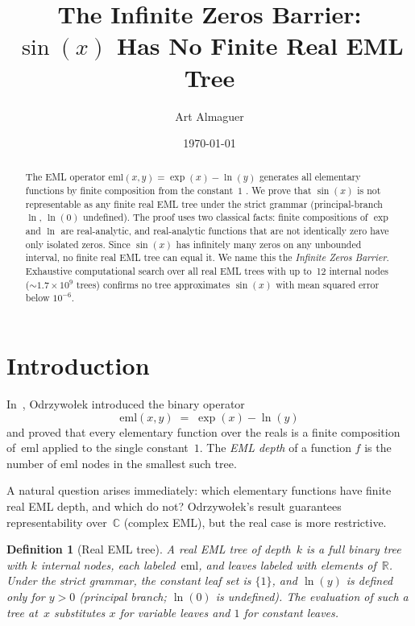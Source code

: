 \documentclass[11pt,a4paper]{amsart}
\title{The Infinite Zeros Barrier:\\
  \large $\sin(x)$ Has No Finite Real EML Tree}
\author{Art Almaguer}
\date{\today}
\newtheorem{definition}[theorem]{Definition}
\newcommand{\eml}{\mathrm{eml}}
\newcommand{\R}{\mathbb{R}}
\newcommand{\C}{\mathbb{C}}
\begin{document}
\begin{abstract}
The EML operator $\eml(x,y) = \exp(x) - \ln(y)$ generates all elementary
functions by finite composition from the constant~$1$
\cite{odzryzwolek2026eml}.
We prove that $\sin(x)$ is not representable as any finite real EML tree
under the strict grammar (principal-branch $\ln$, $\ln(0)$ undefined).
The proof uses two classical facts: finite compositions of $\exp$ and $\ln$
are real-analytic, and real-analytic functions that are not identically zero
have only isolated zeros.  Since $\sin(x)$ has infinitely many zeros on any
unbounded interval, no finite real EML tree can equal it.
We name this the \emph{Infinite Zeros Barrier}.
Exhaustive computational search over all real EML trees with up to~12
internal nodes ($\sim\!1.7 \times 10^9$ trees) confirms no tree approximates
$\sin(x)$ with mean squared error below $10^{-6}$.
\end{abstract}

\maketitle

\section{Introduction}

In~\cite{odzryzwolek2026eml}, Odrzywołek introduced the binary operator
\[
  \eml(x,y) \;=\; \exp(x) - \ln(y)
\]
and proved that every elementary function over the reals is a finite composition
of~$\eml$ applied to the single constant~$1$.  The \emph{EML depth} of a function
$f$ is the number of $\eml$ nodes in the smallest such tree.

A natural question arises immediately: which elementary functions have finite
real EML depth, and which do not?  Odrzywołek's result guarantees representability
over~$\C$ (complex EML), but the real case is more restrictive.

\begin{definition}[Real EML tree]
  A \emph{real EML tree} of depth~$k$ is a full binary tree with $k$ internal
  nodes, each labeled~$\eml$, and leaves labeled with elements of~$\R$.
  Under the \emph{strict grammar}, the constant leaf set is $\{1\}$, and
  $\ln(y)$ is defined only for $y > 0$ (principal branch; $\ln(0)$ is undefined).
  The \emph{evaluation} of such a tree at~$x$ substitutes $x$ for variable leaves
  and $1$ for constant leaves.
\end{definition}
\end{document}
